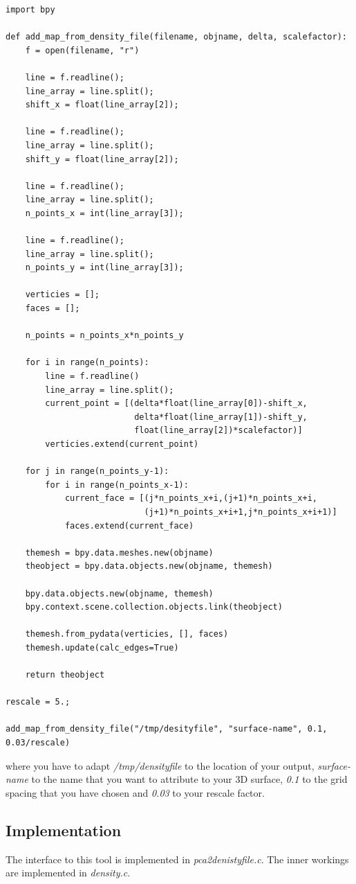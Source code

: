 \begin{lstlisting}
import bpy

def add_map_from_density_file(filename, objname, delta, scalefactor):
    f = open(filename, "r")

    line = f.readline();
    line_array = line.split();
    shift_x = float(line_array[2]);

    line = f.readline();
    line_array = line.split();
    shift_y = float(line_array[2]);

    line = f.readline();
    line_array = line.split();
    n_points_x = int(line_array[3]);

    line = f.readline();
    line_array = line.split();
    n_points_y = int(line_array[3]);

    verticies = [];
    faces = [];

    n_points = n_points_x*n_points_y

    for i in range(n_points):
        line = f.readline()
        line_array = line.split();
        current_point = [(delta*float(line_array[0])-shift_x,
                          delta*float(line_array[1])-shift_y,
                          float(line_array[2])*scalefactor)]
        verticies.extend(current_point)

    for j in range(n_points_y-1):
        for i in range(n_points_x-1):
            current_face = [(j*n_points_x+i,(j+1)*n_points_x+i,
                            (j+1)*n_points_x+i+1,j*n_points_x+i+1)]
            faces.extend(current_face)

    themesh = bpy.data.meshes.new(objname)
    theobject = bpy.data.objects.new(objname, themesh)
    
    bpy.data.objects.new(objname, themesh)
    bpy.context.scene.collection.objects.link(theobject)

    themesh.from_pydata(verticies, [], faces)
    themesh.update(calc_edges=True)

    return theobject

rescale = 5.;

add_map_from_density_file("/tmp/desityfile", "surface-name", 0.1, 0.03/rescale)
\end{lstlisting}
where you have to adapt \emph{/tmp/densityfile} to the location of your
output, \emph{surface-name} to the name that you want to attribute to your 3D
surface, \emph{0.1} to the grid spacing that you have chosen and
\emph{0.03} to your rescale factor.

\subsection{Implementation}
The interface to this tool is implemented in \emph{pca2denistyfile.c}.
The inner workings are implemented in \emph{density.c}.

